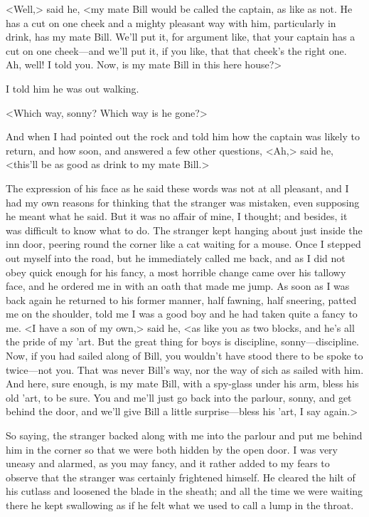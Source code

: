 <Well,> said he, <my mate Bill would be called the captain, as like as not. He has a cut on one cheek and a mighty pleasant way with him, particularly in drink, has my mate Bill. We'll put it, for argument like, that your captain has a cut on one cheek—and we'll put it, if you like, that that cheek's the right one. Ah, well! I told you. Now, is my mate Bill in this here house?>

I told him he was out walking.

<Which way, sonny? Which way is he gone?>

And when I had pointed out the rock and told him how the captain was likely to return, and how soon, and answered a few other questions, <Ah,> said he, <this'll be as good as drink to my mate Bill.>

The expression of his face as he said these words was not at all pleasant, and I had my own reasons for thinking that the stranger was mistaken, even supposing he meant what he said. But it was no affair of mine, I thought; and besides, it was difficult to know what to do. The stranger kept hanging about just inside the inn door, peering round the corner like a cat waiting for a mouse. Once I stepped out myself into the road, but he immediately called me back, and as I did not obey quick enough for his fancy, a most horrible change came over his tallowy face, and he ordered me in with an oath that made me jump. As soon as I was back again he returned to his former manner, half fawning, half sneering, patted me on the shoulder, told me I was a good boy and he had taken quite a fancy to me. <I have a son of my own,> said he, <as like you as two blocks, and he's all the pride of my 'art. But the great thing for boys is discipline, sonny—discipline. Now, if you had sailed along of Bill, you wouldn't have stood there to be spoke to twice—not you. That was never Bill's way, nor the way of sich as sailed with him. And here, sure enough, is my mate Bill, with a spy-glass under his arm, bless his old 'art, to be sure. You and me'll just go back into the parlour, sonny, and get behind the door, and we'll give Bill a little surprise—bless his 'art, I say again.>

So saying, the stranger backed along with me into the parlour and put me behind him in the corner so that we were both hidden by the open door. I was very uneasy and alarmed, as you may fancy, and it rather added to my fears to observe that the stranger was certainly frightened himself. He cleared the hilt of his cutlass and loosened the blade in the sheath; and all the time we were waiting there he kept swallowing as if he felt what we used to call a lump in the throat.

